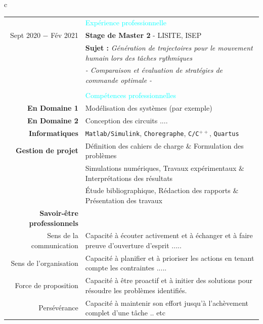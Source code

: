 \documentclass[10pt,a4paper]{report}
\begin{document}
\begin{table}[H]
\begin{tabular}{c}
\begin{tabular}{rl}
& \textcolor {cyan} {\Large{Expérience professionnelle}} \\
Sept 2020 $-$ Fév 2021 & \textbf{\large{Stage de Master 2}} - LISITE, ISEP \\
 & \textbf{Sujet :} \textit{Génération de trajectoires pour le mouvement humain lors des tâches rythmiques} \\
 & \hspace{2.5cm} \textit{- Comparaison et évaluation de stratégies de commande optimale -} \\
\begin{minipage}[htbp]{3.35cm}
\textcolor {cyan} {\rule[-3.25mm]{\linewidth}{2mm}} \\
\end{minipage} 
& \textcolor {cyan} {\Large{Compétences professionnelles}} \\
\textbf{En Domaine 1} & Modélisation des systèmes (par exemple) \\
\textbf{En Domaine 2} & Conception des circuits .... \\
\textbf{Informatiques} & \texttt{Matlab/Simulink}, \texttt{Choregraphe}, \texttt{C/C$^{++}$}, \texttt{Quartus} \\
\textbf{Gestion de projet} & Définition des cahiers de charge $\&$ Formulation des problèmes \\ 
 & Simulations numériques, Travaux expérimentaux $\&$ Interprétations des résultats \\
 & Étude bibliographique, Rédaction des rapports $\&$ Présentation des travaux \\ 
\textbf{Savoir-être professionnels} &  \\
{\small{Sens de la communication}} & Capacité à écouter activement et à échanger et à faire preuve d'ouverture d'esprit ..... \\
{\small{Sens de l'organisation}} & Capacité à planifier et à prioriser les actions en tenant compte les contraintes ..... \\
{\small{Force de proposition}} & Capacité à être proactif et à initier des solutions pour résoudre les problèmes identifiés. \\
{\small{Persévérance}} & Capacité à maintenir son effort jusqu'à l'achèvement complet d'une tâche .. etc \\

\end{tabular}
\end{tabular}
\end{table}
\end{document}

